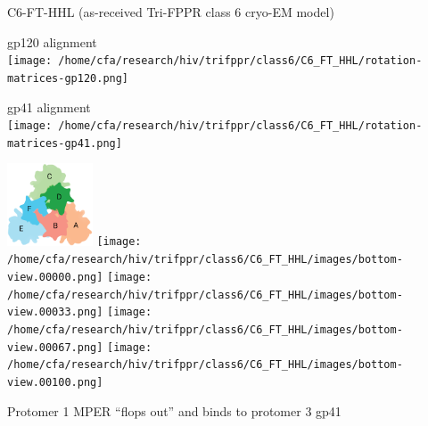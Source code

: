 \begin{frame}[fragile]{C6-FT-HHL (as-received Tri-FPPR class 6 cryo-EM model)}
    \begin{center}
        \begin{minipage}{0.47\textwidth}
            \begin{center}
                gp120 alignment\\
                \texttt{[image: /home/cfa/research/hiv/trifppr/class6/C6\_FT\_HHL/rotation-matrices-gp120.png]}
            \end{center}
        \end{minipage}
        \begin{minipage}{0.47\textwidth}
            \begin{center}
                gp41 alignment\\
                \texttt{[image: /home/cfa/research/hiv/trifppr/class6/C6\_FT\_HHL/rotation-matrices-gp41.png]}
            \end{center}
        \end{minipage}

        \includegraphics[width=0.19\textwidth]{trimer_paint_bottom_sodroski_smol.png}
        \texttt{[image: /home/cfa/research/hiv/trifppr/class6/C6\_FT\_HHL/images/bottom-view.00000.png]}
        \texttt{[image: /home/cfa/research/hiv/trifppr/class6/C6\_FT\_HHL/images/bottom-view.00033.png]}
        \texttt{[image: /home/cfa/research/hiv/trifppr/class6/C6\_FT\_HHL/images/bottom-view.00067.png]}
        \texttt{[image: /home/cfa/research/hiv/trifppr/class6/C6\_FT\_HHL/images/bottom-view.00100.png]}

        Protomer 1 MPER ``flops out'' and binds to protomer 3 gp41
    \end{center}
\end{frame}

